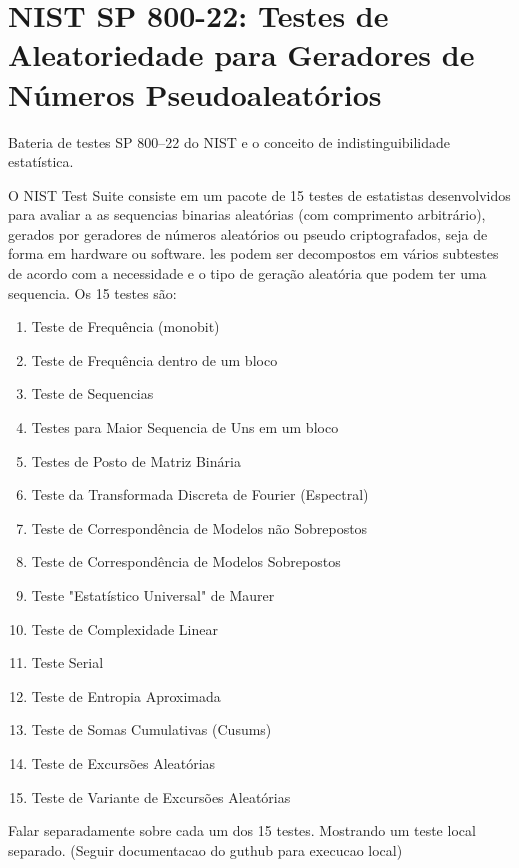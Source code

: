 \chapter{NIST SP 800-22: Testes de Aleatoriedade para Geradores de Números Pseudoaleatórios}
Bateria de testes SP 800--22 do NIST e o conceito de indistinguibilidade estatística.

        O NIST Test Suite consiste em um pacote de 15 testes de estatistas desenvolvidos para avaliar a as sequencias binarias aleatórias (com comprimento arbitrário),
        gerados por geradores de números aleatórios ou pseudo criptografados, seja de forma em hardware ou software. 
        les podem ser decompostos em vários subtestes de acordo com a necessidade e o tipo de geração aleatória que podem ter uma sequencia. Os 15 testes são:
        \begin{enumerate}
          \item Teste de Frequência (monobit)
          \item Teste de Frequência dentro de um bloco
          \item Teste de Sequencias
          \item Testes para Maior Sequencia de Uns em um bloco
          \item Testes de Posto de Matriz Binária
          \item Teste da Transformada Discreta de Fourier (Espectral)
          \item Teste de Correspondência de Modelos não Sobrepostos
          \item Teste de Correspondência de Modelos Sobrepostos
          \item Teste "Estatístico Universal" de Maurer
          \item Teste de Complexidade Linear
          \item Teste Serial
          \item Teste de Entropia Aproximada
          \item Teste de Somas Cumulativas (Cusums)
          \item Teste de Excursões Aleatórias
          \item Teste de Variante de Excursões Aleatórias
        \end{enumerate}\nocite{NistsTP}

        Falar separadamente sobre cada um dos 15 testes. Mostrando um teste local separado. (Seguir documentacao do guthub para execucao local)\cite{NISTGit}
        
